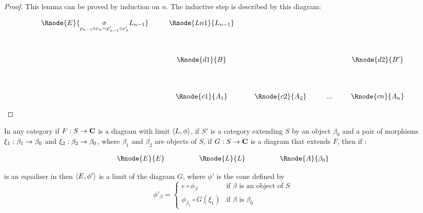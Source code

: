 \documentclass[10pt,a4paper]{scrartcl}
\begin{document}
\begin{proof}
\noindent This lemma can be proved by induction on $n$. 
The inductive step is described by this diagram:

\begin{center}
\begin{displaymath}
\begin{array}{cp{0.3cm}cp{0.3cm}c         p{0.3cm}  c p{0.2cm} c}
\Rnode{E}{\underset{p_{n-1} \circ x_n=p'_{n-1} \circ x'_n}{\sigma}L_{n-1}}&&\Rnode{Ln1}{L_{n-1}}& &               & &     & &                \\ [1.4cm]
&&\Rnode{d1}{B}& &               & &     & &\Rnode{d2}{B'}  \\ [1.4cm]
&&\Rnode{c1}{A_1}& &\Rnode{c2}{A_2}& & ... & &\Rnode{cn}{A_n}
\end{array}
\end{displaymath}
\end{center}

\end{proof}
\iffalse
\begin{lemma}
In any category  if $F: S \rightarrow \textbf{C}$ is a diagram with limit $\langle L,\phi\rangle$,
if $S'$ is a category extending $S$ by an object $\beta_0$ and a pair of morphisms $\xi_1: \beta_1 \rightarrow \beta_0$ and $\xi_2: \beta_2 \rightarrow \beta_0$, where $\beta_1$ and $\beta_2$ are objects of $S$, if $G: S \rightarrow \textbf{C}$ is a diagram that extends $F$, then if :
\begin{center}
\begin{equation}
\label{equaliser}
\begin{array}{cp{1cm}cp{1cm} c}
\Rnode{E}{E}& &    \Rnode{L}{L}  & & \Rnode{A}{\beta_0} 
\end{array}
\end{equation}
\setlength{\arroffsetA}{3pt}
\setlength{\arroffsetB}{3pt}
\setlength{\arroffsetA}{-3pt}
\setlength{\arroffsetB}{-3pt}
\arreset
\end{center}
is an equaliser in  then $\langle E,\phi'\rangle$ is a limit of the diagram $G$, where
$\phi'$ is the cone defined by
\begin{equation*}
\phi'_\beta =
\left\{
	\begin{array}{ll}
		e \circ \phi_\beta           & \mbox{if } \beta \mbox{ is an object of } S  \\
		\phi_{\beta_1} \circ G(\xi_1) & \mbox{if } \beta \mbox{ is } \beta_0 
	\end{array}
\right.
\end{equation*}

\end{lemma}
\end{document}

